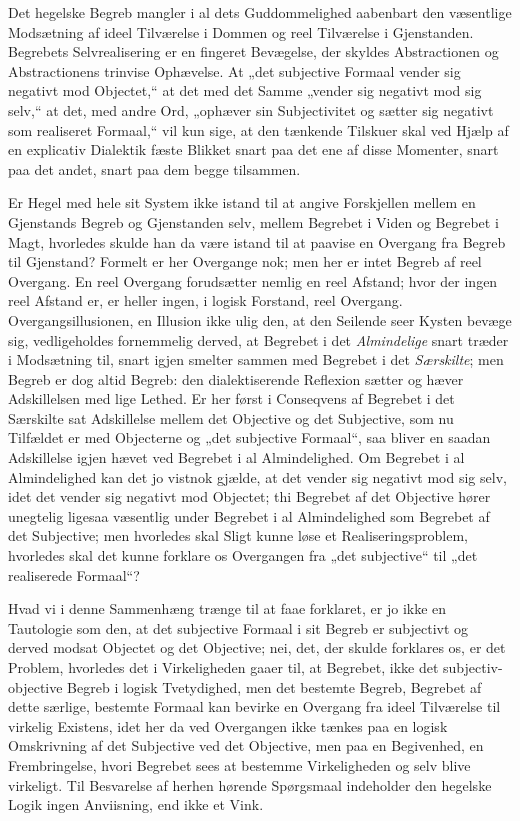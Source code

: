 \documentclass[12pt]{book}
\newcommand{\opage}[1]{\marginnote{\footnotesize\textit{[#1]}}}
\begin{document}
Det hegelske Begreb mangler i al dets Guddommelighed
aabenbart den væsentlige Modsætning af ideel Tilværelse i
Dommen og reel Tilværelse i Gjenstanden. Begrebets Selvrealisering
er en fingeret Bevægelse, der skyldes Abstractionen
og Abstractionens trinvise Ophævelse. At „det subjective Formaal
vender sig negativt mod Objectet,“ at det med det Samme
„vender sig negativt mod sig selv,“ at det, med andre Ord,
„ophæver sin Subjectivitet og sætter sig negativt som realiseret
\opage{132}Formaal,“ vil kun sige, at den tænkende Tilskuer skal ved
Hjælp af en explicativ Dialektik fæste Blikket snart paa det
ene af disse Momenter, snart paa det andet, snart paa dem
begge tilsammen.

Er Hegel med hele sit System ikke istand til at angive
Forskjellen mellem en Gjenstands Begreb og Gjenstanden selv,
mellem Begrebet i Viden og Begrebet i Magt, hvorledes
skulde han da være istand til at paavise en Overgang fra
Begreb til Gjenstand? Formelt er her Overgange nok; men
her er intet Begreb af reel Overgang. En reel Overgang
forudsætter nemlig en reel Afstand; hvor der ingen reel Afstand
er, er heller ingen, i logisk Forstand, reel Overgang.
Overgangsillusionen, en Illusion ikke ulig den, at den Seilende
seer Kysten bevæge sig, vedligeholdes fornemmelig derved,
at Begrebet i det \emph{Almindelige} snart træder i Modsætning
til, snart igjen smelter sammen med Begrebet i det \emph{Særskilte};
men Begreb er dog altid Begreb: den dialektiserende Reflexion
sætter og hæver Adskillelsen med lige Lethed. Er her
først i Conseqvens af Begrebet i det Særskilte sat Adskillelse
mellem det Objective og det Subjective, som nu Tilfældet er
med Objecterne og „det subjective Formaal“, saa bliver en
saadan Adskillelse igjen hævet ved Begrebet i al Almindelighed.
Om Begrebet i al Almindelighed kan det jo vistnok gjælde,
at det vender sig negativt mod sig selv, idet det vender sig
negativt mod Objectet; thi Begrebet af det Objective hører
unegtelig ligesaa væsentlig under Begrebet i al Almindelighed
som Begrebet af det Subjective; men hvorledes skal Sligt
kunne løse et Realiseringsproblem, hvorledes skal det kunne
forklare os Overgangen fra „det subjective“ til „det realiserede
Formaal“?

Hvad vi i denne Sammenhæng trænge til at faae forklaret,
er jo ikke en Tautologie som den, at det subjective Formaal
i sit Begreb er subjectivt og derved modsat Objectet og
det Objective; nei, det, der skulde forklares os, er det Problem,
\opage{133}hvorledes det i Virkeligheden gaaer til, at Begrebet, ikke det
subjectiv-objective Begreb i logisk Tvetydighed, men det bestemte
Begreb, Begrebet af dette særlige, bestemte Formaal kan
bevirke en Overgang fra ideel Tilværelse til virkelig Existens,
idet her da ved Overgangen ikke tænkes paa en logisk Omskrivning
af det Subjective ved det Objective, men paa en
Begivenhed, en Frembringelse, hvori Begrebet sees at bestemme
Virkeligheden og selv blive virkeligt. Til Besvarelse af herhen
hørende Spørgsmaal indeholder den hegelske Logik ingen
Anviisning, end ikke et Vink.
\end{document}
